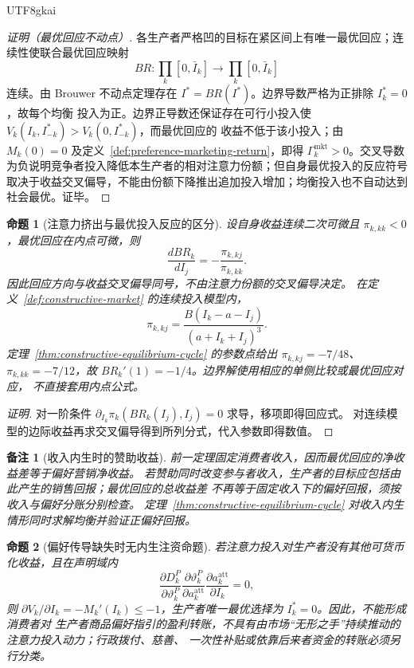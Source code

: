 \documentclass[12pt,a4paper,openany]{report}
\newtheorem{proposition}{命题}[chapter]
\newtheorem{remark}{备注}[chapter]
\begin{document}
\begin{CJK*}{UTF8}{gkai}
\begin{proof}[证明（最优回应不动点）]
各生产者严格凹的目标在紧区间上有唯一最优回应；连续性使联合最优回应映射
\[
  BR:\prod_k[0,\bar I_k]\longrightarrow\prod_k[0,\bar I_k]
\]
连续。由 Brouwer 不动点定理存在 \(I^*=BR(I^*)\)。边界导数严格为正排除 \(I_k^*=0\)，故每个均衡
投入为正。边界正导数还保证存在可行小投入使 \(V_k(I_k,I_{-k}^*)>V_k(0,I_{-k}^*)\)，而最优回应的
收益不低于该小投入；由 \(M_k(0)=0\) 及定义~\ref{def:preference-marketing-return}，即得
\(\Gamma_k^{\mathrm{mkt}}>0\)。交叉导数为负说明竞争者投入降低本生产者的相对注意力份额；但自身最优投入的反应符号取决于收益交叉偏导，不能由份额下降推出追加投入增加；均衡投入也不自动达到社会最优。证毕。
\end{proof}

\begin{proposition}[注意力挤出与最优投入反应的区分]
\label{prop:sponsor-response-sign}
设自身收益连续二次可微且 \(\pi_{k,kk}<0\)，最优回应在内点可微，则
\[
 \frac{dBR_k}{dI_j}=-\frac{\pi_{k,kj}}{\pi_{k,kk}}.
\]
因此回应方向与收益交叉偏导同号，不由注意力份额的交叉偏导决定。
在定义~\ref{def:constructive-market} 的连续投入模型内，
\[
 \pi_{k,kj}=\frac{B(I_k-a-I_j)}{(a+I_k+I_j)^3}.
\]
定理~\ref{thm:constructive-equilibrium-cycle} 的参数点给出 \(\pi_{k,kj}=-7/48\)、
\(\pi_{k,kk}=-7/12\)，故 \(BR_k'(1)=-1/4\)。边界解使用相应的单侧比较或最优回应对应，
不直接套用内点公式。
\end{proposition}
\begin{proof}[证明]
对一阶条件 \(\partial_{I_k}\pi_k(BR_k(I_j),I_j)=0\) 求导，移项即得回应式。
对连续模型的边际收益再求交叉偏导得到所列分式，代入参数即得数值。
\end{proof}

\begin{remark}[收入内生时的赞助收益]
前一定理固定消费者收入，因而最优回应的净收益差等于偏好营销净收益。
若赞助同时改变参与者收入，生产者的目标应包括由此产生的销售回报；最优回应的总收益差
不再等于固定收入下的偏好回报，须按收入与偏好分账分别检查。
定理~\ref{thm:constructive-equilibrium-cycle} 对收入内生情形同时求解均衡并验证正偏好回报。
\end{remark}

\begin{proposition}[偏好传导缺失时无内生注资命题]
\label{prop:no-guidance-no-market-injection}
若注意力投入对生产者没有其他可货币化收益，且在声明域内
\[
  \frac{\partial D_k^P}{\partial\vartheta_k^P}
  \frac{\partial\vartheta_k^P}{\partial a_k^{\mathrm{att}}}
  \frac{\partial a_k^{\mathrm{att}}}{\partial I_k}=0,
\]
则 \(\partial V_k/\partial I_k=-M_k'(I_k)\le-1\)，生产者唯一最优选择为 \(I_k^*=0\)。因此，不能形成消费者对
生产者商品偏好指引的盈利转账，不具有由市场“无形之手”持续推动的注意力投入动力；行政拨付、慈善、
一次性补贴或依靠后来者资金的转账必须另行分类。
\end{proposition}


\end{CJK*}
\end{document}
